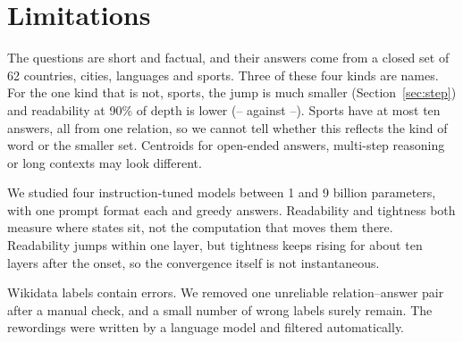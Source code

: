 \section{Limitations}
\label{sec:limits}

The questions are short and factual, and their answers come from a closed set of 62 countries, cities, languages and sports. Three of these four kinds are names. For the one kind that is not, sports, the jump is much smaller (Section~\ref{sec:step}) and readability at 90\% of depth is lower (\SportLateMin{}--\SportLateMax{} against \NamesLateMin{}--\NamesLateMax{}). Sports have at most ten answers, all from one relation, so we cannot tell whether this reflects the kind of word or the smaller set. Centroids for open-ended answers, multi-step reasoning or long contexts may look different.

We studied four instruction-tuned models between 1 and 9 billion parameters, with one prompt format each and greedy answers. Readability and tightness both measure where states sit, not the computation that moves them there. Readability jumps within one layer, but tightness keeps rising for about ten layers after the onset, so the convergence itself is not instantaneous.

Wikidata labels contain errors. We removed one unreliable relation--answer pair after a manual check, and a small number of wrong labels surely remain. The rewordings were written by a language model and filtered automatically.
